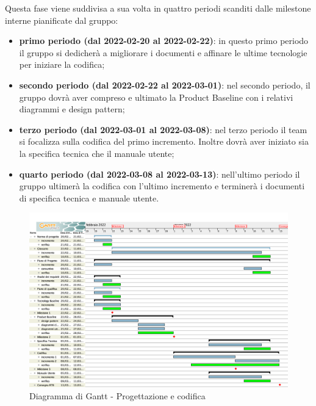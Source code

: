 Questa fase viene suddivisa a sua volta in quattro periodi scanditi dalle milestone interne pianificate dal gruppo:
\begin{itemize}
\item \textbf{primo periodo (dal 2022-02-20 al 2022-02-22)}: in questo primo periodo il gruppo si dedicherà a migliorare i documenti e affinare le ultime tecnologie per iniziare la codifica;
\item \textbf{secondo periodo (dal 2022-02-22 al 2022-03-01)}: nel secondo periodo,  il gruppo dovrà aver compreso e ultimato la Product Baseline con i relativi diagrammi e design pattern;
\item \textbf{terzo periodo (dal 2022-03-01 al 2022-03-08)}: nel terzo periodo il team si focalizza sulla codifica del primo incremento.  Inoltre dovrà aver iniziato sia la specifica tecnica che il manuale utente;
\item \textbf{quarto periodo (dal 2022-03-08 al 2022-03-13)}: nell'ultimo periodo il gruppo ultimerà la codifica con l’ultimo incremento e terminerà i documenti di specifica tecnica e manuale utente.
\end{itemize}

\begin{figure}[!h]
\centering
\includegraphics[scale=0.35]{Sezioni/gantt/progettazione_codifica.png}
\caption{Diagramma di Gantt - Progettazione e codifica}
\end{figure}
